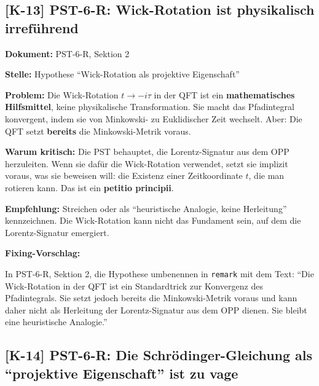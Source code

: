 \documentclass[11pt,a4paper]{article}
\newcommand{\K}[1]{\textbf{[K-#1]}}
\newcommand{\Dok}[1]{\noindent\textbf{Dokument:} #1\par\smallskip}
\newcommand{\Stelle}[1]{\noindent\textbf{Stelle:} #1\par\smallskip}
\newcommand{\Prob}[1]{\noindent\textbf{Problem:} #1\par\smallskip}
\newcommand{\Krit}[1]{\noindent\textbf{Warum kritisch:} #1\par\smallskip}
\newcommand{\Empf}[1]{\noindent\textbf{Empfehlung:} #1\par\smallskip}
\newenvironment{Fix}
  {\par\medskip\noindent\textbf{Fixing-Vorschlag:}\par\nobreak\smallskip}
  {\par\medskip}
\begin{document}
\subsection{\K{13} PST-6-R: Wick-Rotation ist physikalisch irreführend}

\Dok{PST-6-R, Sektion 2}
\Stelle{Hypothese ``Wick-Rotation als projektive Eigenschaft''}
\Prob{Die Wick-Rotation $t \to -i\tau$ in der QFT ist ein
\textbf{mathematisches Hilfsmittel}, keine physikalische
Transformation. Sie macht das Pfadintegral konvergent, indem sie
von Minkowski- zu Euklidischer Zeit wechselt. Aber: Die QFT setzt
\textbf{bereits} die Minkowski-Metrik voraus.}
\Krit{Die PST behauptet, die Lorentz-Signatur aus dem OPP
herzuleiten. Wenn sie dafür die Wick-Rotation verwendet, setzt sie
implizit voraus, was sie beweisen will: die Existenz einer
Zeitkoordinate $t$, die man rotieren kann. Das ist ein
\textbf{petitio principii}.}
\Empf{Streichen oder als ``heuristische Analogie, keine Herleitung''
kennzeichnen. Die Wick-Rotation kann nicht das Fundament sein, auf dem
die Lorentz-Signatur emergiert.}
\begin{Fix}
In PST-6-R, Sektion 2, die Hypothese umbenennen in
\texttt{remark} mit dem Text: ``Die Wick-Rotation in der QFT ist ein
Standardtrick zur Konvergenz des Pfadintegrals. Sie setzt jedoch
bereits die Minkowski-Metrik voraus und kann daher nicht als
Herleitung der Lorentz-Signatur aus dem OPP dienen. Sie bleibt eine
heuristische Analogie.''
\end{Fix}

\subsection{\K{14} PST-6-R: Die Schrödinger-Gleichung als
``projektive Eigenschaft'' ist zu vage}
\end{document}
